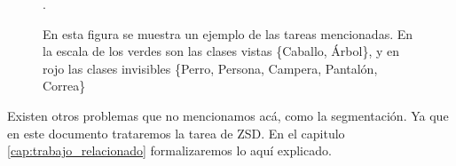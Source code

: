 \begin{figure}[H]
  \centering
  \hspace{1em}%
  \caption{En esta figura se muestra un ejemplo de las tareas mencionadas. En la escala de los verdes son las clases vistas \{Caballo, Árbol\}, y en rojo las clases invisibles \{Perro, Persona, Campera, Pantalón, Correa\}}.\
\end{figure}

Existen otros problemas que no mencionamos acá, como la segmentación. Ya que en este documento trataremos la tarea de ZSD. En el capitulo \autoref{cap:trabajo_relacionado} formalizaremos lo aquí explicado.

